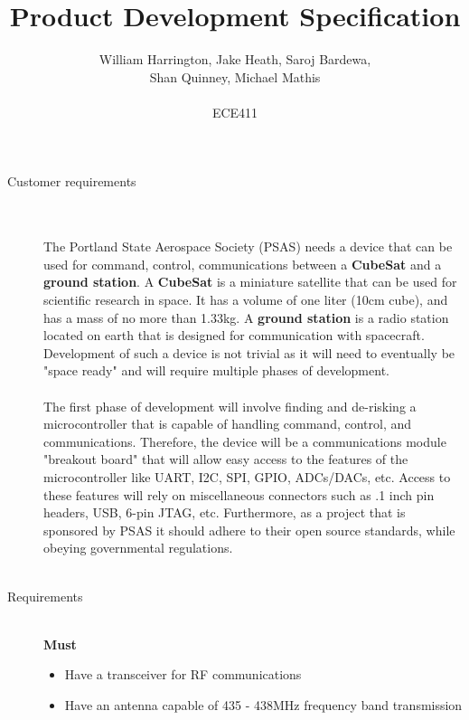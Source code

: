 \documentclass[12pt]{article}
\begin{document}
\title{Product Development Specification}%
\author{William Harrington, Jake Heath, Saroj Bardewa,\\ Shan Quinney, Michael Mathis\\ \\ %
ECE411} %

\maketitle
 \small
\begin{description}
	\item[Customer requirements] \hfill \\ \\
		The Portland State Aerospace Society (PSAS) needs a device that can be used for command, control, communications between a \textbf{CubeSat} and a \textbf{ground station}.
		A \textbf{CubeSat} is a miniature satellite that can be used for scientific research in space. It has a volume of one liter (10cm cube), and has a mass of no more than 1.33kg.
		A \textbf{ground station} is a radio station located on earth that is designed for communication with spacecraft.
		Development of such a device is not trivial as it will need to eventually be "space ready" and will require multiple phases of development. \hfill \\ \\
		The first phase of development will involve finding and de-risking a microcontroller that is capable of handling command, control, and communications.
		Therefore, the device will be a communications module "breakout board" that will allow easy access to the features of the microcontroller like UART, I2C, SPI, GPIO, ADCs/DACs, etc. Access to these features will rely on miscellaneous connectors such as .1 inch pin headers, USB, 6-pin JTAG, etc. Furthermore, as a project that is sponsored by PSAS it should adhere to their open source standards, while obeying governmental regulations.
		\hfill \\ \\
		\newpage
	\item[Requirements] \hfill \\
		\textbf{Must}
		\begin{itemize}
			\item{Have a transceiver for RF communications}
      			\item{Have an antenna capable of 435 - 438MHz frequency band transmission}

\end{itemize}
\end{description}
\end{document}
